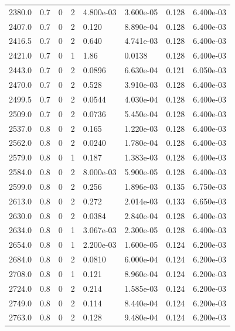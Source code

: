 \documentclass[preview]{standalone}
\begin{document}
{{{{{\begin{tabular}{L{1.2cm}C{1.2cm} C{0.3cm}C{0.5cm} C{1.4cm}C{1.4cm} C{1.4cm}C{1.4cm}}
  2380.0  &   0.7  & 0     &  2 &  4.800e-03  & 3.600e-05  & 0.128 &  6.400e-03   \\ 
  2407.0  &   0.7  & 0     &  2 &  0.120  & 8.890e-04  & 0.128 &  6.400e-03   \\ 
  2416.5  &   0.7  & 0     &  2 &  0.640  & 4.741e-03  & 0.128 &  6.400e-03   \\ 
  2421.0  &   0.7  & 0     &  1 &  1.86  & 0.0138  & 0.128 &  6.400e-03   \\ 
  2443.0  &   0.7  & 0     &  2 &  0.0896  & 6.630e-04  & 0.121 &  6.050e-03   \\ 
  2470.0  &   0.7  & 0     &  2 &  0.528  & 3.910e-03  & 0.128 &  6.400e-03   \\ 
  2499.5  &   0.7  & 0     &  2 &  0.0544  & 4.030e-04  & 0.128 &  6.400e-03   \\ 
  2509.0  &   0.7  & 0     &  2 &  0.0736  & 5.450e-04  & 0.128 &  6.400e-03   \\ 
  2537.0  &   0.8  & 0     &  2 &  0.165  & 1.220e-03  & 0.128 &  6.400e-03   \\ 
  2562.0  &   0.8  & 0     &  2 &  0.0240  & 1.780e-04  & 0.128 &  6.400e-03   \\ 
  2579.0  &   0.8  & 0     &  1 &  0.187  & 1.383e-03  & 0.128 &  6.400e-03   \\ 
  2584.0  &   0.8  & 0     &  2 &  8.000e-03  & 5.900e-05  & 0.128 &  6.400e-03   \\ 
  2599.0  &   0.8  & 0     &  2 &  0.256  & 1.896e-03  & 0.135 &  6.750e-03   \\ 
  2613.0  &   0.8  & 0     &  2 &  0.272  & 2.014e-03  & 0.133 &  6.650e-03   \\ 
  2630.0  &   0.8  & 0     &  2 &  0.0384  & 2.840e-04  & 0.128 &  6.400e-03   \\ 
  2634.0  &   0.8  & 0     &  1 &  3.067e-03  & 2.300e-05  & 0.128 &  6.400e-03   \\ 
  2654.0  &   0.8  & 0     &  1 &  2.200e-03  & 1.600e-05  & 0.124 &  6.200e-03   \\ 
  2684.0  &   0.8  & 0     &  2 &  0.0810  & 6.000e-04  & 0.124 &  6.200e-03   \\ 
  2708.0  &   0.8  & 0     &  1 &  0.121  & 8.960e-04  & 0.124 &  6.200e-03   \\ 
  2724.0  &   0.8  & 0     &  2 &  0.214  & 1.585e-03  & 0.124 &  6.200e-03   \\ 
  2749.0  &   0.8  & 0     &  2 &  0.114  & 8.440e-04  & 0.124 &  6.200e-03   \\ 
  2763.0  &   0.8  & 0     &  2 &  0.128  & 9.480e-04  & 0.124 &  6.200e-03   \\ 

\end{tabular}}}}}}
\end{document}
